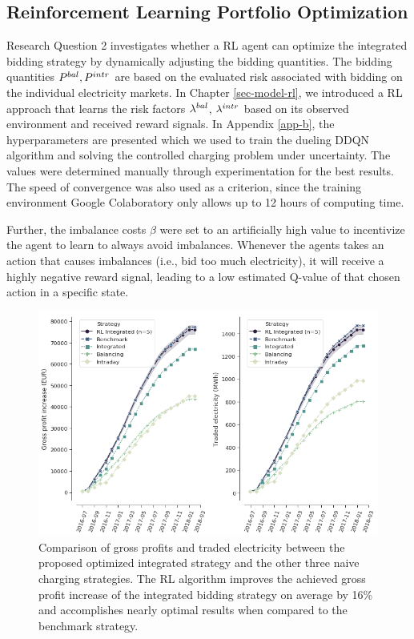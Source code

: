 \documentclass[a4paper, 12pt]{article}
\begin{document}
\subsection{Reinforcement Learning Portfolio Optimization}
\label{sec:orgc1a7a64}
Research Question 2 investigates whether a RL agent can optimize the integrated
bidding strategy by dynamically adjusting the bidding quantities. The bidding
quantities \(P^{bal}_{}, P^{intr}_{}\) are based on the evaluated risk associated with
bidding on the individual electricity markets. In Chapter \ref{sec-model-rl}, we
introduced a RL approach that learns the risk factors \(\lambda^{bal}_{}\), \(\lambda^{intr}_{}\) based on
its observed environment and received reward signals. In Appendix \ref{app-b}, the
hyperparameters are presented which we used to train the dueling DDQN algorithm
and solving the controlled charging problem under uncertainty. The values were
determined manually through experimentation for the best results. The speed of
convergence was also used as a criterion, since the training environment Google
Colaboratory only allows up to 12 hours of computing time.

Further, the imbalance costs \(\beta\) were set to an artificially high value to
incentivize the agent to learn to always avoid imbalances. Whenever the agents
takes an action that causes imbalances (i.e., bid too much electricity), it will
receive a highly negative reward signal, leading to a low estimated Q-value of
that chosen action in a specific state.

\begin{figure}[h]
\centering
\includegraphics[width=1\linewidth]{./fig/rl-results.png}
\caption[Comparison of gross profit results]{Comparison of gross profits and traded electricity between the proposed optimized integrated strategy and the other three naive charging strategies. The RL algorithm improves the achieved gross profit increase of the integrated bidding strategy on average by 16\% and accomplishes nearly optimal results when compared to the benchmark strategy. \label{fig-rl-profits}}
\end{figure}
\end{document}
